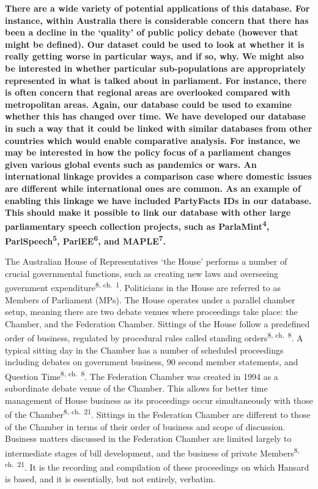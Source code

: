 \documentclass[
  letterpaper,
  DIV=11,
  numbers=noendperiod]{scrartcl}
\begin{document}
\textbf{There are a wide variety of potential applications of this
database. For instance, within Australia there is considerable concern
that there has been a decline in the `quality' of public policy debate
(however that might be defined). Our dataset could be used to look at
whether it is really getting worse in particular ways, and if so, why.
We might also be interested in whether particular sub-populations are
appropriately represented in what is talked about in parliament. For
instance, there is often concern that regional areas are overlooked
compared with metropolitan areas. Again, our database could be used to
examine whether this has changed over time. We have developed our
database in such a way that it could be linked with similar databases
from other countries which would enable comparative analysis. For
instance, we may be interested in how the policy focus of a parliament
changes given various global events such as pandemics or wars. An
international linkage provides a comparison case where domestic issues
are different while international ones are common. As an example of
enabling this linkage we have included PartyFacts IDs in our database.
This should make it possible to link our database with other large
parliamentary speech collection projects, such as
ParlaMint\textsuperscript{4}, ParlSpeech\textsuperscript{5},
ParlEE\textsuperscript{6}, and MAPLE\textsuperscript{7}.}

The Australian House of Representatives `the House' performs a number of
crucial governmental functions, such as creating new laws and overseeing
government expenditure\textsuperscript{8, ch.~1}. Politicians in the
House are referred to as Members of Parliament (MPs). The House operates
under a parallel chamber setup, meaning there are two debate venues
where proceedings take place: the Chamber, and the Federation Chamber.
Sittings of the House follow a predefined order of business, regulated
by procedural rules called standing orders\textsuperscript{8, ch.~8}. A
typical sitting day in the Chamber has a number of scheduled proceedings
including debates on government business, 90 second member statements,
and Question Time\textsuperscript{8, ch.~8}. The Federation Chamber was
created in 1994 as a subordinate debate venue of the Chamber. This
allows for better time management of House business as its proceedings
occur simultaneously with those of the Chamber\textsuperscript{8,
ch.~21}. Sittings in the Federation Chamber are different to those of
the Chamber in terms of their order of business and scope of discussion.
Business matters discussed in the Federation Chamber are limited largely
to intermediate stages of bill development, and the business of private
Members\textsuperscript{8, ch.~21}. It is the recording and compilation
of these proceedings on which Hansard is based, and it is essentially,
but not entirely, verbatim.
\end{document}
